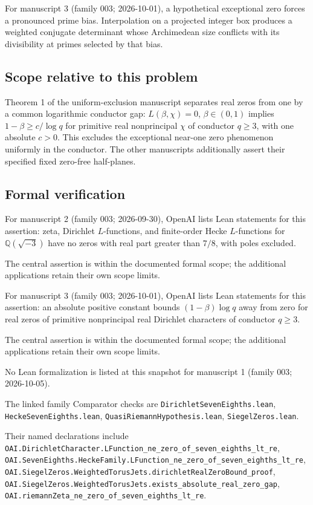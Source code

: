\documentclass[11pt]{article}
\begin{document}
For manuscript 3 (family 003; 2026-10-01), a hypothetical exceptional zero forces a pronounced prime bias. Interpolation on a projected integer box produces a weighted conjugate determinant whose Archimedean size conflicts with its divisibility at primes selected by that bias.

\subsection{Scope relative to this problem}
Theorem 1 of the uniform-exclusion manuscript separates real zeros from one by a common logarithmic conductor gap: $L(\beta,\chi)=0$, $\beta\in(0,1)$ implies $1-\beta\ge c/\log q$ for primitive real nonprincipal $\chi$ of conductor $q\ge3$, with one absolute $c>0$. This excludes the exceptional near-one zero phenomenon uniformly in the conductor. The other manuscripts additionally assert their specified fixed zero-free half-planes.

\subsection{Formal verification}
For manuscript 2 (family 003; 2026-09-30), OpenAI lists Lean statements for this assertion: zeta, Dirichlet $L$-functions, and finite-order Hecke $L$-functions for $\mathbb Q(\sqrt{-3})$ have no zeros with real part greater than $7/8$, with poles excluded.

The central assertion is within the documented formal scope; the additional applications retain their own scope limits.

For manuscript 3 (family 003; 2026-10-01), OpenAI lists Lean statements for this assertion: an absolute positive constant bounds $(1-\beta)\log q$ away from zero for real zeros of primitive nonprincipal real Dirichlet characters of conductor $q\ge3$.

The central assertion is within the documented formal scope; the additional applications retain their own scope limits.

No Lean formalization is listed at this snapshot for manuscript 1 (family 003; 2026-10-05).

The linked family Comparator checks are \texttt{DirichletSevenEighths.lean}, \texttt{HeckeSevenEighths.lean}, \texttt{QuasiRiemannHypothesis.lean}, \texttt{SiegelZeros.lean}.

Their named declarations include \texttt{OAI.DirichletCharacter.LFunction\_ne\_zero\_of\_seven\_eighths\_lt\_re}, \texttt{OAI.SevenEighths.HeckeFamily.LFunction\_ne\_zero\_of\_seven\_eighths\_lt\_re}, \texttt{OAI.SiegelZeros.WeightedTorusJets.dirichletRealZeroBound\_proof}, \texttt{OAI.SiegelZeros.WeightedTorusJets.exists\_absolute\_real\_zero\_gap}, \texttt{OAI.riemannZeta\_ne\_zero\_of\_seven\_eighths\_lt\_re}.
\end{document}
